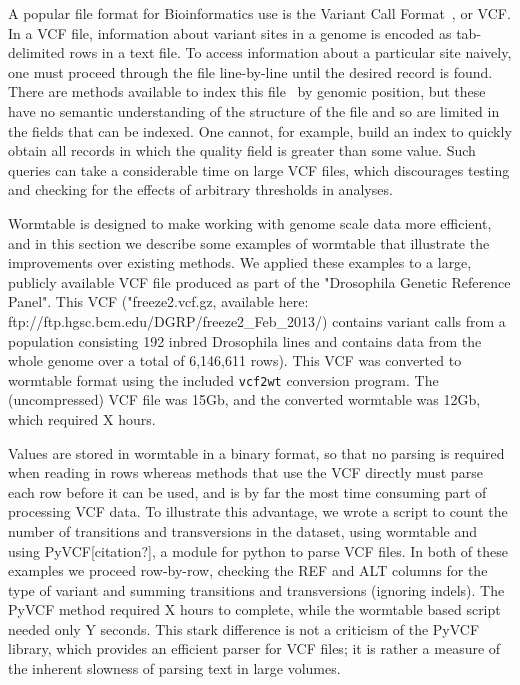 \documentclass{bioinfo}
\begin{document}
A popular file format for Bioinformatics use is the Variant Call Format~\citep{da+11},
or VCF. In a VCF file, information about variant sites in a genome is encoded 
as tab-delimited rows in a text file. To access information about a 
particular site naively, one must proceed through the file line-by-line until the 
desired record is found. There are methods available to index this 
file~\citep{li11} by genomic position, but these have no semantic 
understanding of the structure of the file and so are limited in the 
fields that can be indexed. One cannot, for example, build an index 
to quickly obtain all records in which the quality field is greater
than some value. Such queries can take a considerable time on large VCF 
files, which discourages testing and checking for the effects of 
arbitrary thresholds in analyses.

Wormtable is designed to make working with genome scale data more 
efficient, and in this section we describe some examples of wormtable
that illustrate the improvements over existing methods. We applied these 
examples to a large, publicly available VCF file produced as part of the
"Drosophila Genetic Reference Panel". This VCF ("freeze2.vcf.gz, available 
here: ftp://ftp.hgsc.bcm.edu/DGRP/freeze2_Feb_2013/) contains variant calls 
from a population consisting 192 inbred Drosophila lines and contains data 
from the whole genome over a total of 6,146,611 rows). This VCF was converted to 
wormtable format using the included \texttt{vcf2wt} conversion program.  
The (uncompressed) VCF file was 15Gb, and the converted wormtable was 12Gb,
which required X hours.

Values are stored in wormtable in a binary format, so that no parsing is
required when reading in rows whereas methods that use the VCF directly 
must parse each row before it can be used, and is by far the most time 
consuming part of processing VCF data. To illustrate this advantage, we
wrote a script to count the number of transitions and transversions
in the dataset, using wormtable and using PyVCF[citation?], a module for
python to parse VCF files. In both of these examples we proceed 
row-by-row, checking the REF and ALT columns for the type of variant and
summing transitions and transversions (ignoring indels). The 
PyVCF method required X hours to complete, while the wormtable 
based script needed only Y seconds. This stark difference is not a 
criticism of the PyVCF library, which provides an efficient parser 
for VCF files; it is rather a measure of the inherent slowness of
parsing text in large volumes.
\end{document}
